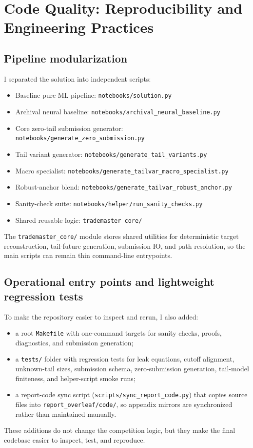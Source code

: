 \section{Code Quality: Reproducibility and Engineering Practices}

\subsection{Pipeline modularization}
I separated the solution into independent scripts:
\begin{itemize}[leftmargin=1.5em]
  \item Baseline pure-ML pipeline: \texttt{notebooks/solution.py}
  \item Archival neural baseline: \texttt{notebooks/archival\_neural\_baseline.py}
  \item Core zero-tail submission generator: \texttt{notebooks/generate\_zero\_submission.py}
  \item Tail variant generator: \texttt{notebooks/generate\_tail\_variants.py}
  \item Macro specialist: \texttt{notebooks/generate\_tailvar\_macro\_specialist.py}
  \item Robust-anchor blend: \texttt{notebooks/generate\_tailvar\_robust\_anchor.py}
  \item Sanity-check suite: \texttt{notebooks/helper/run\_sanity\_checks.py}
  \item Shared reusable logic: \texttt{trademaster\_core/}
\end{itemize}
The \texttt{trademaster\_core/} module stores shared utilities for deterministic target reconstruction, tail-future generation, submission IO, and path resolution, so the main scripts can remain thin command-line entrypoints.

\subsection{Operational entry points and lightweight regression tests}
To make the repository easier to inspect and rerun, I also added:
\begin{itemize}[leftmargin=1.5em]
  \item a root \texttt{Makefile} with one-command targets for sanity checks, proofs, diagnostics, and submission generation;
  \item a \texttt{tests/} folder with regression tests for leak equations, cutoff alignment, unknown-tail sizes, submission schema, zero-submission generation, tail-model finiteness, and helper-script smoke runs;
  \item a report-code sync script (\texttt{scripts/sync\_report\_code.py}) that copies source files into \texttt{report\_overleaf/code/}, so appendix mirrors are synchronized rather than maintained manually.
\end{itemize}
These additions do not change the competition logic, but they make the final codebase easier to inspect, test, and reproduce.

